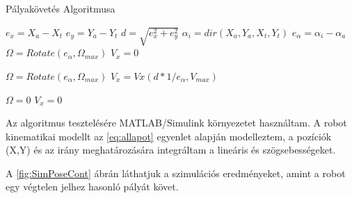\begin{algorithm}
   \caption{Pályakövetés Algoritmusa}
    \begin{algorithmic}[1]
      
       \State $e_x = X_a-X_t$
       \State $e_y = Y_a-Y_t$
       \State $d=\sqrt{e_x^2+e_y^2}$
       \State $\alpha_i=dir(X_a,Y_a,X_t,Y_t)$ 
       \State $e_\alpha=\alpha_i-\alpha_a$
             
                \State $\Omega = Rotate(e_\alpha,\Omega_{max}) $
                \State $V_x = 0 $
            \Else {}
                
                \State $\Omega = Rotate(e_\alpha,\Omega_{max}) $
                \State $V_x = Vx(d*1/e_\alpha,V_{max})$
            \EndIf
     
             
                \State $\Omega = 0$
                \State $V_x = 0 $
            \EndIf
        
       \EndFunction

\end{algorithmic}
\end{algorithm}



Az algoritmus tesztelésére MATLAB/Simulink környezetet használtam. A robot kinematikai modellt az \ref{eq:allapot} egyenlet alapján modelleztem, a pozíciók (X,Y) és az irány meghatározására integráltam a lineáris és szögsebességeket. 

A \ref{fig:SimPoseCont} ábrán láthatjuk a szimulációs eredményeket, amint a robot egy végtelen jelhez hasonló pályát követ.

